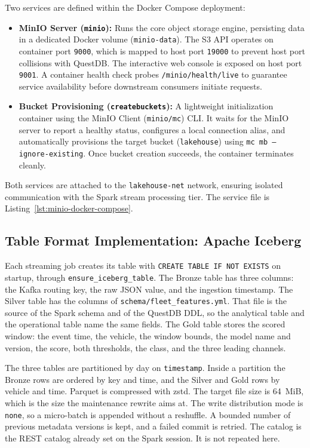 Two services are defined within the Docker Compose deployment:
\begin{itemize}
    \item \textbf{MinIO Server (\texttt{minio}):} Runs the core object storage engine, persisting data in a dedicated Docker volume (\texttt{minio-data}). The S3 API operates on container port \texttt{9000}, which is mapped to host port \texttt{19000} to prevent host port collisions with QuestDB. The interactive web console is exposed on host port \texttt{9001}. A container health check probes \texttt{/minio/health/live} to guarantee service availability before downstream consumers initiate requests.
    \item \textbf{Bucket Provisioning (\texttt{createbuckets}):} A lightweight initialization container using the MinIO Client (\texttt{minio/mc}) CLI. It waits for the MinIO server to report a healthy status, configures a local connection alias, and automatically provisions the target bucket (\texttt{lakehouse}) using \texttt{mc mb --ignore-existing}. Once bucket creation succeeds, the container terminates cleanly.
\end{itemize}

Both services are attached to the \texttt{lakehouse-net} network, ensuring isolated communication with the Spark stream processing tier. The service file is Listing~\ref{lst:minio-docker-compose}.


\subsection{Table Format Implementation: Apache Iceberg}
\label{subsec:iceberg-implementation}

Each streaming job creates its table with \texttt{CREATE TABLE IF NOT EXISTS} on startup, through \texttt{ensure\_iceberg\_table}. The Bronze table has three columns: the Kafka routing key, the raw JSON value, and the ingestion timestamp. The Silver table has the columns of \texttt{schema/fleet\_features.yml}. That file is the source of the Spark schema and of the QuestDB DDL, so the analytical table and the operational table name the same fields. The Gold table stores the scored window: the event time, the vehicle, the window bounds, the model name and version, the score, both thresholds, the class, and the three leading channels.

The three tables are partitioned by day on \texttt{timestamp}. Inside a partition the Bronze rows are ordered by key and time, and the Silver and Gold rows by vehicle and time. Parquet is compressed with zstd. The target file size is 64~MiB, which is the size the maintenance rewrite aims at. The write distribution mode is \texttt{none}, so a micro-batch is appended without a reshuffle. A bounded number of previous metadata versions is kept, and a failed commit is retried. The catalog is the REST catalog already set on the Spark session. It is not repeated here.

